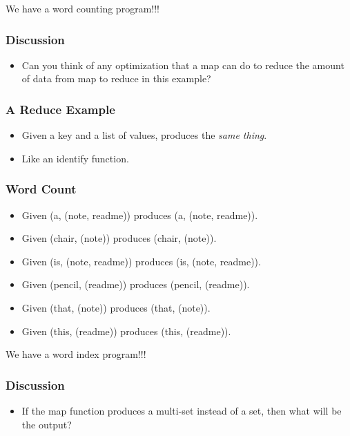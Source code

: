 \documentclass{beamer}
\begin{document}
\begin{frame}
  \huge{We have a word counting program!!!}
\end{frame}

\begin{frame}
  \frametitle{Discussion}
  \begin{itemize}
    \item Can you think of any optimization that a map can do to
      reduce the amount of data from map to reduce in this example?
  \end{itemize}
\end{frame}

\begin{frame}
  \frametitle{A Reduce Example} 
  \begin{itemize}
    \item Given a key and a list of values, produces the {\em same
      thing}.
    \item Like an identify function.
  \end{itemize}
\end{frame}

\begin{frame}
  \frametitle{Word Count} 
  \begin{itemize}
  \item Given (a, (note, readme)) produces (a, (note, readme)).
  \item Given (chair, (note)) produces (chair, (note)).
  \item Given (is, (note, readme)) produces (is, (note, readme)).
  \item Given (pencil, (readme)) produces (pencil, (readme)).
  \item Given (that, (note)) produces (that, (note)).
  \item Given (this, (readme)) produces (this, (readme)).
  \end{itemize}
\end{frame}

\begin{frame}
  \huge{We have a word index program!!!}
\end{frame}

\begin{frame}
  \frametitle{Discussion}
  \begin{itemize}
    \item If the map function produces a multi-set instead of a set,
      then what will be the output?
  \end{itemize}
\end{frame}
\end{document}
